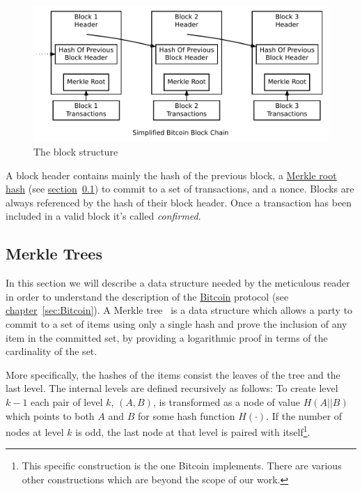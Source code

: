 \vspace{0.3cm}
\begin{figure}[bh]
  \centering
  \includegraphics[width=\columnwidth,keepaspectratio]{Images/block-structure.pdf}
  \caption{The block structure~\cite{Nakamoto_bitcoin:a}}
  \label{fig:block-structure}
\end{figure}
\vspace{0.3cm}

A block header contains mainly the hash of the previous block, a \hyperref[sec:merkle-trees]{Merkle root hash} (see \hyperref[sec:merkle-trees]{section}~\ref{sec:merkle-trees}) to commit to a set of transactions, and a nonce. Blocks are always referenced by the hash of their block header. Once a transaction has been included in a valid block it's called \emph{confirmed}.

\subsection{Merkle Trees} \label{sec:merkle-trees}
In this section we will describe a data structure needed by the meticulous reader in order to understand the description of the \hyperref[sec:Bitcoin]{Bitcoin} protocol (see \hyperref[sec:Bitcoin]{chapter}~\ref{sec:Bitcoin}).
A Merkle tree~\cite{merkle} is a data structure which allows a party to commit to a set of items using only a single hash and prove the inclusion of any item in the committed set, by providing a logarithmic proof in terms of the cardinality of the set.

More specifically, the hashes of the items consist the leaves of the tree and the last level. The internal levels are defined recursively as follows: To create level $k-1$ each pair of level $k$, $(A, B)$, is transformed as a node of value $H(A || B)$ which points to both $A$ and $B$ for some hash function $H(\cdot)$. If the number of nodes at level $k$ is odd, the last node at that level is paired with itself\footnote{This specific construction is the one Bitcoin implements. There are various other constructions which are beyond the scope of our work.}.

